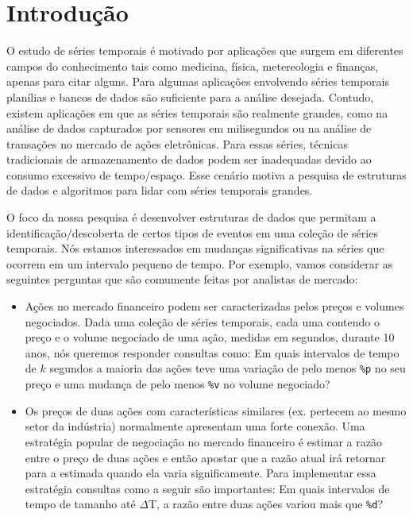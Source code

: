 \documentclass[dissertacao, brazil]{ThesisPUC}
\begin{document}
\section{Introdução}

O estudo de séries temporais é motivado por aplicações que surgem 
em diferentes campos do conhecimento tais como medicina, física, metereologia
e finanças, apenas para citar alguns. Para algumas aplicações envolvendo
séries temporais planílias e bancos de dados são suficiente para a análise
desejada. Contudo, existem aplicações em que as séries temporais são realmente grandes,
como na análise de dados capturados por sensores em milisegundos ou na
análise de transações no mercado de ações eletrônicas. Para essas
séries, técnicas tradicionais de armazenamento de dados podem ser inadequadas
devido ao consumo excessivo de tempo/espaço. Esse cenário motiva a pesquisa de 
estruturas de dados e algoritmos para lidar com séries temporais grandes\cite{lala}.

O foco da nossa pesquisa é desenvolver estruturas de dados que permitam
a identificação/descoberta de certos tipos de eventos em uma coleção
de séries temporais. Nós estamos interessados em mudanças significativas
na séries que ocorrem em um intervalo pequeno de tempo. Por exemplo,
vamos considerar as seguintes perguntas que são comumente feitas por analistas
de mercado:

\begin{itemize}
\item Ações no mercado financeiro podem ser caracterizadas pelos preços e volumes negociados.
 Dada uma coleção de séries temporais, cada uma contendo o preço e o volume negociado de uma ação, 
 medidas em segundos, durante 10 anos, nós queremos responder consultas como: Em quais intervalos
de tempo de $k$ segundos a maioria das ações teve uma variação de pelo
menos {\tt \%p} no seu preço e uma mudança de pelo menos {\tt \%v} no volume
negociado?

\item Os preços de duas ações com características similares (ex. pertecem
ao mesmo setor da indústria) normalmente apresentam uma forte conexão.
 Uma estratégia popular de negociação no mercado financeiro é estimar a razão
entre o preço de duas ações e então apostar que a razão atual irá
retornar para a estimada quando ela varia significamente. Para implementar
essa estratégia consultas como a seguir são importantes: Em quais intervalos
de tempo de tamanho até $\Delta$T, a razão entre duas ações variou mais que
{\tt \%d}?

\end{itemize}
\end{document}
